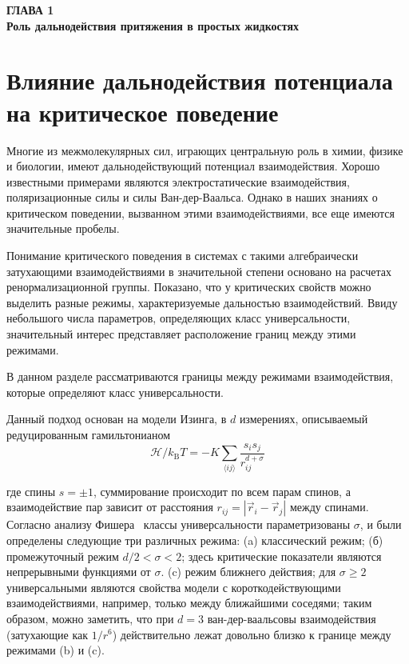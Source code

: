 \newpage
\begin{center}
\textbf{\large ГЛАВА 1 \\ Роль дальнодействия притяжения в простых жидкостях}
\end{center}



\section{Влияние дальнодействия потенциала на критическое поведение}

Многие из межмолекулярных сил, играющих центральную роль в химии, физике и биологии, имеют дальнодействующий потенциал взаимодействия.
Хорошо известными примерами являются электростатические взаимодействия, поляризационные силы и силы Ван-дер-Ваальса.
Однако в наших знаниях о критическом поведении, вызванном этими взаимодействиями, все еще имеются значительные пробелы.

Понимание критического поведения в системах с такими алгебраически затухающими взаимодействиями в значительной степени основано на расчетах ренормализационной группы.
Показано, что у критических свойств можно выделить разные режимы, характеризуемые дальностью взаимодействий.
Ввиду небольшого числа параметров, определяющих класс универсальности, значительный интерес представляет расположение границ между этими режимами.

В данном разделе рассматриваются границы между режимами взаимодействия, которые определяют класс универсальности. 

Данный подход основан на модели Изинга, в $d$ измерениях, описываемый редуцированным гамильтонианом
\begin{equation}
\mathcal{H} / k_{\mathrm{B}} T=-K \sum_{\langle i j\rangle} \frac{s_{i} s_{j}}{r_{i j}^{d+\sigma}}
\label{eq1}
\end{equation}

где спины $s=\pm 1$, суммирование происходит по всем парам спинов, а взаимодействие пар зависит от расстояния $r_{i j}=\left|\vec {r}_{i}-\vec{r}_{j}\right|$ между спинами. Согласно анализу Фишера~\cite{10.1103/PhysRevLett.29.917} классы универсальности параметризованы $\sigma$, и были определены следующие три различных режима: (a) классический режим; (б) промежуточный режим $d/2<\sigma<2$; здесь критические показатели являются непрерывными функциями от $\sigma$. (c) режим ближнего действия; для $\sigma\geq 2$ универсальными являются свойства модели с короткодействующими взаимодействиями, например, только между ближайшими соседями; таким образом, можно заметить, что при $d=3$ ван-дер-ваальсовы взаимодействия (затухающие как $1/r^{6}$) действительно лежат довольно близко к границе между режимами (b) и (c).

